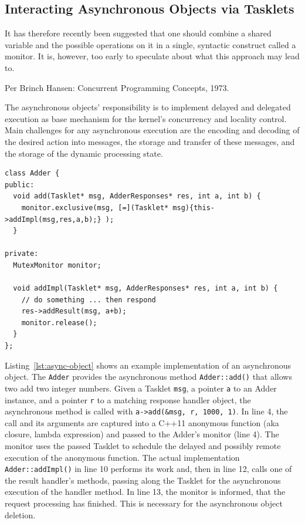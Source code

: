 \subsection{Interacting Asynchronous Objects via Tasklets}
\label{sec:tasklet-impl}

\epigraph{It has therefore recently been suggested that one should combine a shared variable and the possible operations on it in a single, syntactic construct called a monitor. It is, however, too early to speculate about what this approach may lead to.}{Per Brinch Hansen: Concurrent Programming Concepts, 1973.}

The asynchronous objects' responsibility is to implement delayed and delegated execution as base mechanism for the kernel's concurrency and locality control. Main challenges for any asynchronous execution are the encoding and decoding of the desired action into messages, the storage and transfer of these messages, and the storage of the dynamic processing state.     


\begin{lstlisting}[float, label=lst:async-object, caption=An example asynchronous object.]
class Adder {
public:
  void add(Tasklet* msg, AdderResponses* res, int a, int b) {
    monitor.exclusive(msg, [=](Tasklet* msg){this->addImpl(msg,res,a,b);} );
  }

private:
  MutexMonitor monitor;

  void addImpl(Tasklet* msg, AdderResponses* res, int a, int b) {
    // do something ... then respond
    res->addResult(msg, a+b);
    monitor.release();
  }
};
\end{lstlisting}

Listing~\ref{lst:async-object} shows an example implementation of an asynchronous object. The \texttt{Adder} provides the asynchronous method \texttt{Adder::add()} that allows two add two integer numbers.
Given a Tasklet \texttt{msg}, a pointer \texttt{a} to an Adder instance, and a pointer \texttt{r} to a matching response handler object, the asynchronous method is called with \lstinline|a->add(&msg, r, 1000, 1)|. In line 4, the call and its arguments are captured into a C++11 anonymous function (aka closure, lambda expression) and passed to the Adder's monitor (line 4). The monitor uses the passed Tasklet to schedule the delayed and possibly remote execution of the anonymous function. The actual implementation \lstinline|Adder::addImpl()| in line 10 performs its work and, then in line 12, calls one of the result handler's methods, passing along the Tasklet for the asynchronous execution of the handler method. In line 13, the monitor is informed, that the request processing has finished. This is necessary for the asynchronous object deletion. 

